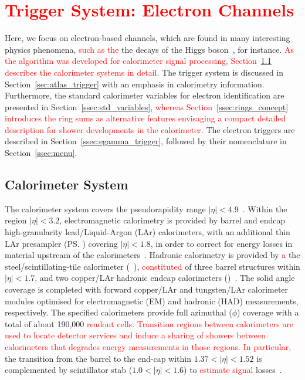 \chapter{\textcolor{red}{Trigger System: Electron Channels}}\label{sec:context}



Here, we focus on electron-based channels, which are found in many interesting physics phenomena, \textcolor{red}{such as the} the decays of the Higgs boson~\cite{HIGG-2012-27,HIGG-2016-33}, for instance.  
\textcolor{red}{As the \rnn{} algorithm was developed for calorimeter signal processing, Section~\ref{ssec:calo} describes the calorimeter systems in detail.} The trigger system is discussed in Section~\ref{sec:atlas_trigger} with an emphasis in calorimetry information.  Furthermore, the standard calorimeter variables for electron identification are presented in Section~\ref{ssec:std_variables}, \textcolor{red}{whereas Section~\ref{ssec:rings_concept} introduces the ring sums as alternative features envisaging a compact detailed description for shower developments in the calorimeter.} The electron triggers are described in Section~\ref{ssec:egamma_trigger}, followed by their nomenclature in Section~\ref{ssec:menu}.





\section{Calorimeter System}\label{ssec:calo}

The calorimeter system covers the pseudorapidity
range \(|\eta| < 4.9\)~\cite{PERF-2007-01}. Within the region \(|\eta|< 3.2\),
electromagnetic calorimetry is provided by barrel and endcap high-granularity
lead/Liquid-Argon (LAr) calorimeters, with an additional thin LAr presampler
(\ps) covering \(|\eta| < 1.8\), in order to correct for energy losses in
material upstream of the calorimeters~\cite{LARG-2009-01,larg_tdr}. Hadronic
calorimetry is provided by \textcolor{red}{a} the steel/scintillating-tile calorimeter
(\tilecal~\cite{TCAL-2017-01,tile_tdr}), \textcolor{red}{constituted} of three barrel structures
within \(|\eta| < 1.7\), and two copper/LAr hadronic endcap calorimeters
(\hec)~\cite{cal_tdr}.  The solid angle coverage is completed with forward
copper/LAr and tungsten/LAr calorimeter modules optimised for electromagnetic
(EM) and hadronic (HAD) measurements, respectively. The specified calorimeters
provide full azimuthal ($\phi$) coverage with a total of about 190,000 \textcolor{red}{readout cells. Transition regions between calorimeters are used to locate detector services and induce a sharing of showers between calorimeters that degrades energy measurements in those regions. In particular,} the transition from the barrel to the end-cap within
$1.37<|\eta|<1.52$ is complemented by scintillator stab ($1.0<|\eta|<1.6$) to
\textcolor{red}{estimate signal} losses~\cite{cal_tdr}.


